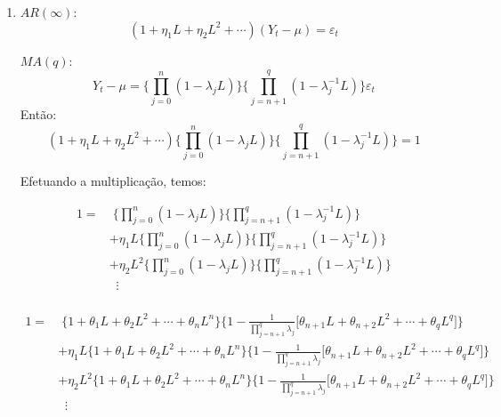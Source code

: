 \begin{enumerate}
	\item[\fbox{3.7}]
	
	$AR(\infty)$: $$(1+\eta_1L+\eta_2L^2+\cdots)(Y_t-\mu)=\varepsilon_t$$
	
	$MA(q)$:$$Y_t-\mu=\Bigg\{\prod\limits_{j=0}^n(1-\lambda_jL)\Bigg\}\Bigg\{\prod\limits_{j=n+1}^q(1-\lambda_j^{-1}L)\Bigg\}\varepsilon_t$$		
	Então:
	$$(1+\eta_1L+\eta_2L^2+\cdots)\Bigg\{\prod\limits_{j=0}^n(1-\lambda_jL)\Bigg\}\Bigg\{\prod\limits_{j=n+1}^q(1-\lambda_j^{-1}L)\Bigg\}=1$$
	
	Efetuando a multiplicação, temos:
	
	\begin{align*}
		1=&\; \Bigg\{\prod\limits_{j=0}^n(1-\lambda_jL)\Bigg\}\Bigg\{\prod\limits_{j=n+1}^q(1-\lambda_j^{-1}L)\Bigg\}\\
		&+\eta_1L\Bigg\{\prod\limits_{j=0}^n(1-\lambda_jL)\Bigg\}\Bigg\{\prod\limits_{j=n+1}^q(1-\lambda_j^{-1}L)\Bigg\}\\
		&+\eta_2L^2\Bigg\{\prod\limits_{j=0}^n(1-\lambda_jL)\Bigg\}\Bigg\{\prod\limits_{j=n+1}^q(1-\lambda_j^{-1}L)\Bigg\}\\
		&\;\;\vdots\\
	\end{align*}


\begin{align*}
	1=&\; \Bigg\{1+\theta_1L+\theta_2L^2+\cdots+\theta_nL^n\Bigg\}\Bigg\{1-\frac{1}{\prod\limits_{j=n+1}^q\lambda_j}\bigg[\theta_{n+1}L+\theta_{n+2}L^2+\cdots+\theta_qL^q\bigg]\Bigg\}\\
	&+\eta_1L\Bigg\{1+\theta_1L+\theta_2L^2+\cdots+\theta_nL^n\Bigg\}\Bigg\{1-\frac{1}{\prod\limits_{j=n+1}^q\lambda_j}\bigg[\theta_{n+1}L+\theta_{n+2}L^2+\cdots+\theta_qL^q\bigg]\Bigg\}\\
	&+\eta_2L^2\Bigg\{1+\theta_1L+\theta_2L^2+\cdots+\theta_nL^n\Bigg\}\Bigg\{1-\frac{1}{\prod\limits_{j=n+1}^q\lambda_j}\bigg[\theta_{n+1}L+\theta_{n+2}L^2+\cdots+\theta_qL^q\bigg]\Bigg\}\\
	&\;\;\vdots\\
\end{align*}


\end{enumerate}

